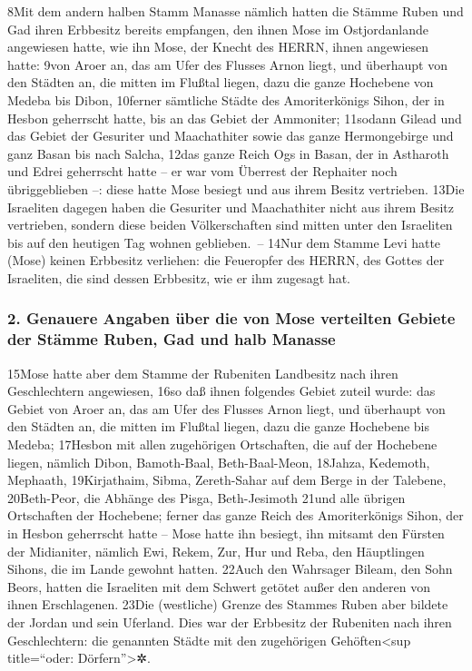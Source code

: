 8Mit dem andern halben Stamm Manasse nämlich hatten die Stämme Ruben und
Gad ihren Erbbesitz bereits empfangen, den ihnen Mose im Ostjordanlande
angewiesen hatte, wie ihn Mose, der Knecht des HERRN, ihnen angewiesen
hatte: 9von Aroer an, das am Ufer des Flusses Arnon liegt, und überhaupt
von den Städten an, die mitten im Flußtal liegen, dazu die ganze
Hochebene von Medeba bis Dibon, 10ferner sämtliche Städte des
Amoriterkönigs Sihon, der in Hesbon geherrscht hatte, bis an das Gebiet
der Ammoniter; 11sodann Gilead und das Gebiet der Gesuriter und
Maachathiter sowie das ganze Hermongebirge und ganz Basan bis nach
Salcha, 12das ganze Reich Ogs in Basan, der in Astharoth und Edrei
geherrscht hatte -- er war vom Überrest der Rephaiter noch
übriggeblieben --: diese hatte Mose besiegt und aus ihrem Besitz
vertrieben. 13Die Israeliten dagegen haben die Gesuriter und
Maachathiter nicht aus ihrem Besitz vertrieben, sondern diese beiden
Völkerschaften sind mitten unter den Israeliten bis auf den heutigen Tag
wohnen geblieben.~-- 14Nur dem Stamme Levi hatte (Mose) keinen Erbbesitz
verliehen: die Feueropfer des HERRN, des Gottes der Israeliten, die sind
dessen Erbbesitz, wie er ihm zugesagt hat.

\hypertarget{genauere-angaben-uxfcber-die-von-mose-verteilten-gebiete-der-stuxe4mme-ruben-gad-und-halb-manasse}{%
\subsubsection{2. Genauere Angaben über die von Mose verteilten Gebiete
der Stämme Ruben, Gad und halb
Manasse}\label{genauere-angaben-uxfcber-die-von-mose-verteilten-gebiete-der-stuxe4mme-ruben-gad-und-halb-manasse}}

15Mose hatte aber dem Stamme der Rubeniten Landbesitz nach ihren
Geschlechtern angewiesen, 16so daß ihnen folgendes Gebiet zuteil wurde:
das Gebiet von Aroer an, das am Ufer des Flusses Arnon liegt, und
überhaupt von den Städten an, die mitten im Flußtal liegen, dazu die
ganze Hochebene bis Medeba; 17Hesbon mit allen zugehörigen Ortschaften,
die auf der Hochebene liegen, nämlich Dibon, Bamoth-Baal,
Beth-Baal-Meon, 18Jahza, Kedemoth, Mephaath, 19Kirjathaim, Sibma,
Zereth-Sahar auf dem Berge in der Talebene, 20Beth-Peor, die Abhänge des
Pisga, Beth-Jesimoth 21und alle übrigen Ortschaften der Hochebene;
ferner das ganze Reich des Amoriterkönigs Sihon, der in Hesbon
geherrscht hatte -- Mose hatte ihn besiegt, ihn mitsamt den Fürsten der
Midianiter, nämlich Ewi, Rekem, Zur, Hur und Reba, den Häuptlingen
Sihons, die im Lande gewohnt hatten. 22Auch den Wahrsager Bileam, den
Sohn Beors, hatten die Israeliten mit dem Schwert getötet außer den
anderen von ihnen Erschlagenen. 23Die (westliche) Grenze des Stammes
Ruben aber bildete der Jordan und sein Uferland. Dies war der Erbbesitz
der Rubeniten nach ihren Geschlechtern: die genannten Städte mit den
zugehörigen Gehöften\textless sup title=``oder: Dörfern''\textgreater✲.

